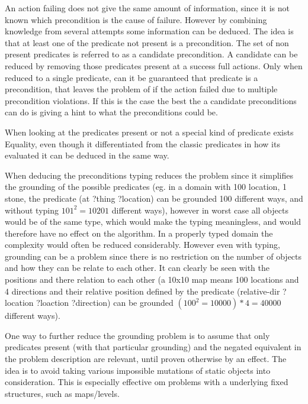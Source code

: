 	An action failing does not give the same amount of information, since it is not known which precondition is the cause of failure. However by combining knowledge from several attempts some information can be deduced. The idea is that at least one of the predicate not present is a precondition. The set of non present predicates is referred to as a candidate precondition. A candidate can be reduced by removing those predicates present at a success full actions. Only when reduced to a single predicate, can it be guaranteed that predicate is a precondition, that leaves the problem of if the action failed due to multiple precondition violations. If this is the case the best the a candidate preconditions can do is giving a hint to what the preconditions could be.
	
	
	When looking at the predicates present or not a special kind of predicate exists Equality, even though it differentiated from the classic predicates in how its evaluated it can be deduced in the same way.
	 

	
	
	
%		
%			
%	
%

	
	
			
	When deducing the preconditions typing reduces the problem since it simplifies the grounding of the possible predicates (eg. in a domain  with 100 location, 1 stone, the predicate (at ?thing ?location) can be grounded 100 different ways, and without typing $101 ^ 2 = 10201$ different ways), however in worst case all objects would be of the same type, which would make the typing meaningless, and would therefore have no effect on the algorithm. In a properly typed domain the complexity would often be reduced considerably. However even with typing, grounding can be a problem since there is no restriction on the number of objects and how they can be relate to each other. It can clearly be seen with the positions and there relation to each other (a 10x10 map means 100 locations and 4 directions and their relative position defined by the predicate (relative-dir ?location ?loaction ?direction) can be grounded $(100 ^ 2 = 10000)*4=40000$ different ways).
	
	One way to further reduce the grounding problem is to assume that only predicates present (with that particular grounding) and the negated equivalent in the problem description are relevant, until proven otherwise by an effect. The idea is to avoid taking various impossible mutations of static objects into consideration. This is especially effective om problems with a underlying fixed structures, such as maps/levels. %
	

